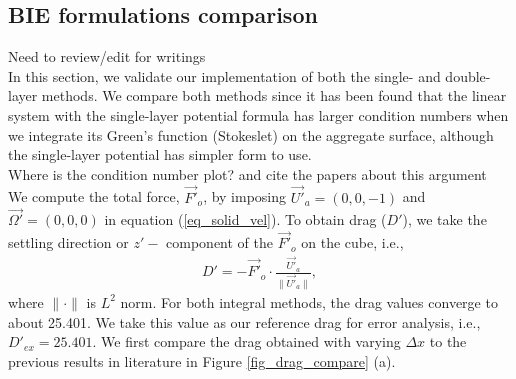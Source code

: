\subsection{BIE formulations comparison}
{\color{blue} Need to review/edit for writings}\\
In this section, we validate our implementation of both the single- and double-layer methods. We compare both methods since it has been found that the linear system with the single-layer potential formula has larger condition numbers when we integrate its Green's function (Stokeslet) on the aggregate surface, although the single-layer potential has simpler form to use. 
\\
{\color{red}Where is the condition number plot? and cite the papers about this argument}
\\
We compute the total force, $ \vec{F'}_o$, by imposing $\vec{U'}_a = (0,0,-1)$ and $\vec{\Omega'} = (0,0,0)$ in equation (\ref{eq_solid_vel}). To obtain drag ($D'$), we take the settling direction or $z'-$ component of the $ \vec{F'}_o$ on the cube, i.e., 
\begin{align}
	D' = - \vec{F'}_o\cdot \frac{\vec{U'}_a}{\| \vec{U'}_a\|},
\end{align}
where $\| \cdot \|$ is $L^2$ norm.
For both integral methods, the drag values converge to about 25.401. We take this value as our reference drag for error analysis, i.e., $D'_{ex} = 25.401.$
We first compare the drag obtained with varying $\Delta x$ to the previous results in literature in Figure \ref{fig_drag_compare} (a).
